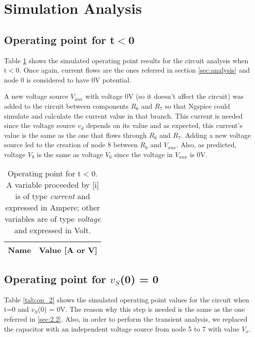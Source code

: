 \section{Simulation Analysis}
\label{sec:simulation}

\subsection{Operating point for t$<$0}

Table \ref{tab:op_1} shows the simulated operating point results for the circuit analysis when t$<$0. Once again, current flows are the ones referred in section \ref{sec:analysis} and node 0 is considered to have 0V potential. \par
 A new voltage source $V_{aux}$ with voltage 0V (so it doesn't affect the circuit) was added to the circuit between components $R_6$ and $R_7$ so that Ngspice could simulate and calculate the current value in that branch. This current is needed since the voltage source $v_d$ depends on its value and as expected, this current's value is the same as the one that flows through $R_6$ and $R_7$. Adding a new voltage source led to the creation of node 8 between $R_6$ and $V_{aux}$. Also, as predicted, voltage $V_8$ is the same as voltage $V_6$ since the voltage in $V_{aux}$ is 0V.

\begin{table}[h]
  \centering
  \begin{tabular}{|l|r|}
    \hline    
    {\bf Name} & {\bf Value [A or V]} \\ \hline
    
  \end{tabular}
  \caption{Operating point for t$<$0. A variable proceeded by [i] is of type {\em current}
    and expressed in Ampere; other variables are of type {\it voltage} and expressed in
    Volt.}
  \label{tab:op_1}
\end{table}
\FloatBarrier

\subsection{Operating point for $v_S$(0) = 0}

Table \ref{tab:op_2} shows the simulated operating point values for the circuit when t=0 and $v_S$(0) = 0V. The reason why this step is needed is the same as the one referred in \ref{sec:2.2}. Also, in order to perform the transient analysis, we replaced the capacitor with an independent voltage source from node 5 to 7 with value $V_x$. 

